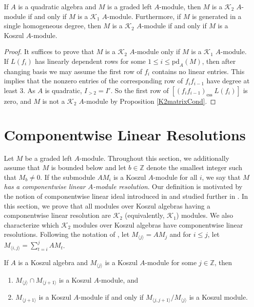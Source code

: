\documentclass[11pt,righttag]{amsart}
\begin{document}
\begin{cor}
\label{K2ModsAreKoszul}
If $A$ is a quadratic algebra and $M$ is a graded left $A$-module, then $M$ is a ${{\mathcal K}}_2$ $A$-module if and only if $M$ is a ${{\mathcal K}}_1$ $A$-module. Furthermore, if $M$ is generated in a single homogeneous degree, then $M$ is a ${{\mathcal K}}_2$ $A$-module if and only if $M$ is a Koszul $A$-module.
\end{cor}

\begin{proof}
It suffices to prove that $M$ is a ${{\mathcal K}}_2$ $A$-module only if $M$ is a ${{\mathcal K}}_1$ $A$-module.
If $L(f_i)$ has linearly dependent rows for some $1\le i\le \text{pd}_A(M)$, then after changing basis we may assume the first row of $f_i$ contains no linear entries. This implies that the nonzero entries of the corresponding row of $f_i f_{i-1}$ have degree at least 3. As $A$ is quadratic, $I_{>2}= I'$. So the first row of $[ (f_{i}f_{i-1})_{\text{ess}}\ L(f_i)]$ is zero, and $M$ is not a ${{\mathcal K}}_2$ $A$-module by Proposition \ref{K2matrixCond}.

\end{proof}

\section{Componentwise Linear Resolutions}
\label{CLmods}

Let $M$ be a graded left $A$-module. Throughout this section, we additionally assume that $M$ is bounded below and let $b\in{{\mathbb Z}}$ denote the smallest integer such that $M_b\neq 0$. If the submodule $AM_i$ is a Koszul $A$-module for all $i$, we say that $M$ \emph{has a componentwise linear $A$-module resolution}. Our definition is motivated by the notion of componentwise linear ideal introduced in \cite{HH} and studied further in \cite{ReinerStamate}. In this section, we prove that all modules over Koszul algebras having a componentwise linear resolution are ${{\mathcal K}}_2$ (equivalently, ${{\mathcal K}}_1$) modules. We also characterize which ${{\mathcal K}}_2$ modules over Koszul algebras have componentwise linear resolutions. Following the notation of \cite{ReinerStamate}, let $M_{{\langle} j{\rangle}}=AM_j$ and for $i\le j$, let $M_{{\langle} i,j {\rangle}}=\sum_{t=i}^j AM_t$. 

\begin{lemma} 
\label{baseCase}
If $A$ is a Koszul algebra and $M_{{\langle} j{\rangle}}$ is a Koszul $A$-module for some $j\in{{\mathbb Z}}$, then
\begin{enumerate}
\item  $M_{{\langle} j{\rangle}}\cap M_{{\langle} j+1{\rangle}}$ is a Koszul $A$-module, and 
\item $M_{{\langle} j+1{\rangle}}$ is a Koszul $A$-module if and only if $M_{{\langle} j,j+1{\rangle}}/M_{{\langle} j{\rangle}}$ is a Koszul module.
\end{enumerate}
\end{lemma}
\end{document}
